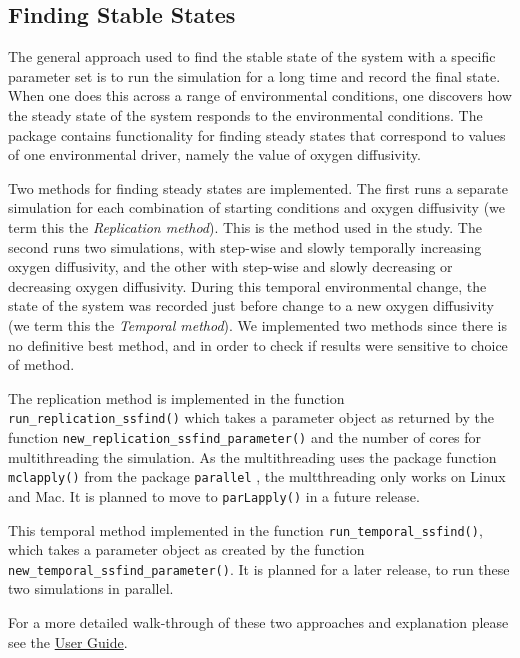 \documentclass[]{elsarticle} %
\begin{document}
\hypertarget{finding-stable-states}{%
\subsection{Finding Stable States}\label{finding-stable-states}}

The general approach used to find the stable state of the system with a
specific parameter set is to run the simulation for a long time and
record the final state. When one does this across a range of
environmental conditions, one discovers how the steady state of the
system responds to the environmental conditions. The package contains
functionality for finding steady states that correspond to values of one
environmental driver, namely the value of oxygen diffusivity.

Two methods for finding steady states are implemented. The first runs a
separate simulation for each combination of starting conditions and
oxygen diffusivity (we term this the \emph{Replication method}). This is
the method used in the \citet{Bush2017} study. The second runs two
simulations, with step-wise and slowly temporally increasing oxygen
diffusivity, and the other with step-wise and slowly decreasing or
decreasing oxygen diffusivity. During this temporal environmental
change, the state of the system was recorded just before change to a new
oxygen diffusivity (we term this the \emph{Temporal method}). We
implemented two methods since there is no definitive best method, and in
order to check if results were sensitive to choice of method.

The replication method is implemented in the function
\texttt{run\_replication\_ssfind()} which takes a parameter object as
returned by the function \texttt{new\_replication\_ssfind\_parameter()}
and the number of cores for multithreading the simulation. As the
multithreading uses the package function \texttt{mclapply()} from the
package \texttt{parallel} \citep{RCoreTeam2022}, the multthreading only
works on Linux and Mac. It is planned to move to \texttt{parLapply()}
\citep{RCoreTeam2022} in a future release.

This temporal method implemented in the function
\texttt{run\_temporal\_ssfind()}, which takes a parameter object as
created by the function \texttt{new\_temporal\_ssfind\_parameter()}. It
is planned for a later release, to run these two simulations in
parallel.

For a more detailed walk-through of these two approaches and explanation
please see the \href{@LINK_NEEDED}{User Guide}.
\end{document}
